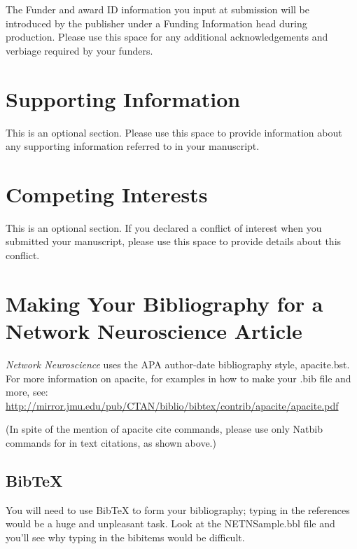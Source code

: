\documentclass[NETN,manuscript]{stjour-new}
\begin{document}
\acknowledgments
The Funder and award ID information you input at submission will be introduced by the publisher under a Funding Information head during production. 
Please use this space for any additional acknowledgements and verbiage required by your funders.



\section{Supporting Information}
This is an optional section. Please use this space to provide information about any supporting information referred to in your manuscript.

\section{Competing Interests}
This is an optional section. If you declared a conflict of interest when you submitted your manuscript, please  use this space to provide details about this conflict.

\section{Making Your Bibliography for a Network Neuroscience Article}
{\it Network Neuroscience} uses the APA author-date  bibliography style,
apacite.bst. For more
information on apacite, for examples in how to make your .bib file and more, see:\\
\href{http://mirror.jmu.edu/pub/CTAN/biblio/bibtex/contrib/apacite/apacite.pdf}
{http://mirror.jmu.edu/pub/CTAN/biblio/bibtex/contrib/apacite/apacite.pdf}

\noindent
(In spite of the mention of apacite cite commands, please use only
Natbib commands for in text citations, as shown above.)

\subsection{BibTeX}
You will need to use BibTeX to form your bibliography; typing in the
references would be
a huge and unpleasant task. Look at the NETNSample.bbl file and you'll see why
typing in the bibitems would be difficult. 
\end{document}

